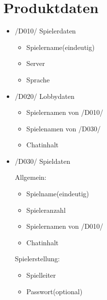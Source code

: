 \documentclass{article}
\begin{document}
\section{Produktdaten}
\begin{itemize}
	\item /D010/ Spielerdaten
	\begin{itemize}
		\item Spielername(eindeutig)
		\item Server
		\item Sprache
	\end{itemize}
		\item /D020/ Lobbydaten
	\begin{itemize}
		\item Spielernamen von /D010/
		\item Spielenamen von /D030/
		\item Chatinhalt
	\end{itemize}
	\item /D030/ Spieldaten

	Allgemein:
	\begin{itemize}
		\item Spielname(eindeutig)
		\item Spieleranzahl
		\item Spielernamen von /D010/
		\item Chatinhalt
	\end{itemize}

	Spielerstellung:
	\begin{itemize}
		\item Spielleiter
		\item Passwort(optional)
	\end{itemize}


\end{itemize}
\end{document}
